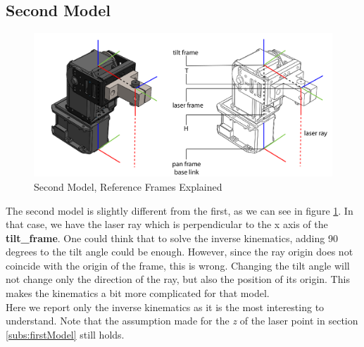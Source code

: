 \subsection{Second Model} \label{subs:secondModel}
\begin{figure}
	\centering
	\includegraphics[width=\textwidth]{img/model2Refbis.png}%
	\caption{Second Model, Reference Frames Explained}
	\label{fig:secondModelRefFrame}
\end{figure}
The second model is slightly different from the first, as we can see in figure \ref{fig:secondModelRefFrame}. In that case, we have the laser ray which is perpendicular to the x axis of the \textbf{tilt\_frame}. One could think that to solve the inverse kinematics, adding 90 degrees to the tilt angle could be enough. However, since the ray origin does not coincide with the origin of the frame, this is wrong. Changing the tilt angle will not change only the direction of the ray, but also the position of its origin. This makes the kinematics a bit more complicated for that model.
\\
Here we report only the inverse kinematics as it is the most interesting to understand. Note that the assumption made for the \textit{z} of the laser point in section \ref{subs:firstModel} still holds.

